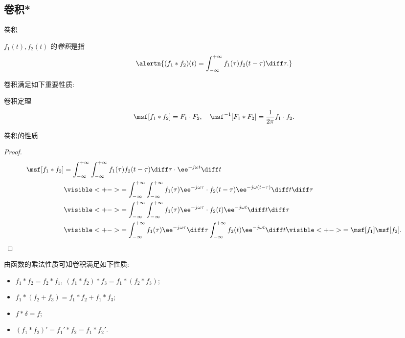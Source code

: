 \subsection{卷积*}
\begin{frame}{卷积\noexer}
	\onslide<+->
	\begin{definition}
		$f_1(t),f_2(t)$ 的\emph{卷积}是指
	\[
		\alertn{(f_1\ast f_2)(t)=\int_{-\infty}^{+\infty} f_1(\tau)f_2(t-\tau)\diff \tau.}
	\]
	\end{definition}
	\onslide<+->
	卷积满足如下重要性质:
	\onslide<+->
	\begin{main}{卷积定理}
	\[\msf[f_1\ast f_2]=F_1\cdot F_2,\quad
	\msf^{-1}[F_1\ast F_2]=\frac1{2\pi}f_1\cdot f_2.
	\]
	\vspace{-\baselineskip}
	\end{main}
\end{frame}


\begin{frame}{卷积的性质\noexer}
	\onslide<+->
	\begin{proof}
		\vspace{-\baselineskip}
		\begin{align*}
			\msf[f_1\ast f_2]&=\int_{-\infty}^{+\infty}\int_{-\infty}^{+\infty}f_1(\tau)f_2(t-\tau)\diff \tau \cdot \ee^{-j\omega t}\diff t\\
			&\visible<+->{=\int_{-\infty}^{+\infty}\int_{-\infty}^{+\infty}f_1(\tau)\ee^{-j\omega \tau}\cdot f_2(t-\tau)\ee^{-j\omega (t-\tau)}\diff t\diff \tau}\\
			&\visible<+->{=\int_{-\infty}^{+\infty}\int_{-\infty}^{+\infty}f_1(\tau)\ee^{-j\omega \tau}\cdot f_2(t)\ee^{-j\omega t}\diff t\diff \tau}\\
			&\visible<+->{=\int_{-\infty}^{+\infty}f_1(\tau)\ee^{-j\omega \tau}\diff\tau\int_{-\infty}^{+\infty}f_2(t)\ee^{-j\omega t}\diff t}\visible<+->{=\msf[f_1]\msf[f_2].\qedhere}
		\end{align*}
	\end{proof}
	\onslide<+->
	由函数的乘法性质可知卷积满足如下性质:
	\begin{itemize}\bf
		\item $f_1\ast f_2=f_2\ast f_1,\ (f_1\ast f_2)\ast f_3=f_1\ast(f_2\ast f_3)$;
		\item $f_1\ast(f_2+f_3)=f_1\ast f_2+f_1\ast f_3$;
		\item $f\ast\delta=f$;
		\item $(f_1\ast f_2)'=f_1'\ast f_2=f_1\ast f_2'$.
	\end{itemize}
\end{frame}


